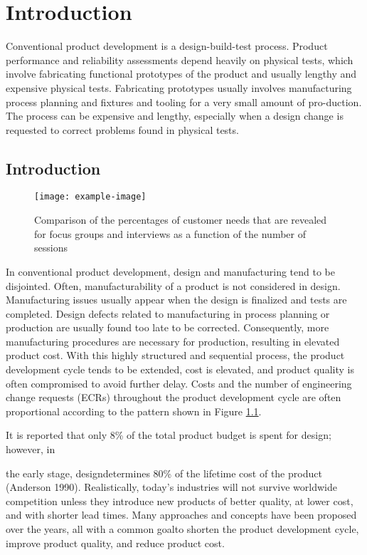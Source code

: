 \chapter{Introduction}

Conventional product development is a design-build-test process.
Product performance and reliability assessments depend heavily on physical tests,
which involve fabricating functional prototypes of the product and usually lengthy and expensive physical tests. 
Fabricating prototypes usually involves manufacturing process planning and fixtures and tooling 
for a very small amount of pro-duction. 
The process can be expensive and lengthy, 
especially when a design change is requested to correct problems found in physical tests.

\section{Introduction}

\begin{figure}[htbp]
  \begin{center}
    \texttt{[image: example-image]}
  \end{center}
  \caption{Comparison of the percentages of customer needs that are revealed for focus groups and interviews as a function of the number of sessions}\label{fig:a}
\end{figure}

In conventional product development, design and manufacturing tend to be disjointed. 
Often, manufacturability of a product is not considered in design. 
Manufacturing issues usually appear when the design is finalized and tests are completed. 
Design defects related to manufacturing in process planning or production 
are usually found too late to be corrected. Consequently, more manufacturing 
procedures are necessary for production, resulting in elevated product cost\cite{cite1}.
With this highly structured and sequential process, the product development cycle tends
to be extended, cost is elevated, and product quality is often compromised to 
avoid further delay. Costs and the number of engineering change requests (ECRs) 
throughout the product development cycle are often proportional according to the pattern 
shown in Figure \ref{fig:a}. 

It is reported that only 8\% of the total product budget is spent for design; however, in 

the early stage, designdetermines 80\% of the lifetime cost of the product (Anderson 1990). 
Realistically, today’s industries will not survive worldwide competition unless they introduce 
new products of better quality, at lower cost, and with shorter lead times. Many approaches 
and concepts have been proposed over the years, all with a common goalto shorten 
the product development cycle, improve product quality, and reduce product cost\cite{cite2}.


